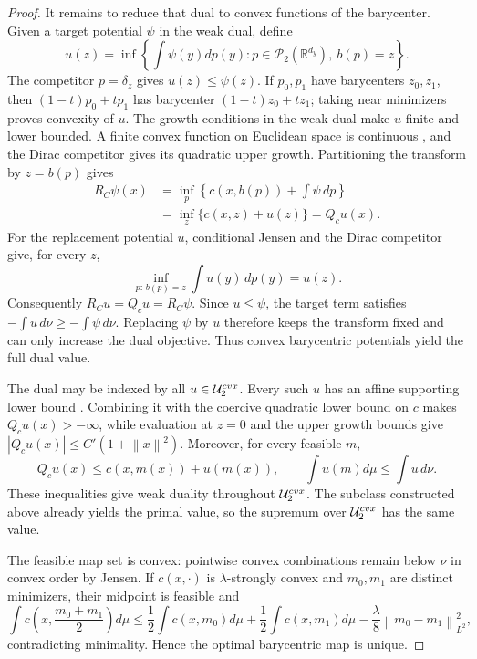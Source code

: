 \documentclass[10pt,a4paper]{amsart}
\newcommand{\R}{\mathbb R}
\newcommand{\cP}{\mathcal P}
\newcommand{\norm}[1]{\left\lVert #1\right\rVert}
\begin{document}
\begin{proof}
It remains to reduce that dual to convex functions of the barycenter.  Given a
target potential $\psi$ in the weak dual, define
\[
 u(z)=\inf\left\{\int\psi(y)dp(y):p\in\cP_2(\R^{d_y}),\ b(p)=z\right\}.
\]
The competitor $p=\delta_z$ gives $u(z)\le\psi(z)$.  If $p_0,p_1$ have
barycenters $z_0,z_1$, then $(1-t)p_0+tp_1$ has barycenter
$(1-t)z_0+tz_1$; taking near minimizers proves convexity of $u$.  The growth
conditions in the weak dual make $u$ finite and lower bounded.  A finite convex
function on Euclidean space is continuous
\cite[Corollary~10.1.1]{Rockafellar}, and the Dirac competitor gives its
quadratic upper growth.  Partitioning the transform by $z=b(p)$ gives
\begin{align*}
 R_C\psi(x)
 &=\inf_{p}\left\{c(x,b(p))+\int\psi\,dp\right\}\\
 &=\inf_z\{c(x,z)+u(z)\}=Q_cu(x).
\end{align*}
For the replacement potential $u$, conditional Jensen and the Dirac competitor
give, for every $z$,
\[
 \inf_{p:\,b(p)=z}\int u(y)\,dp(y)=u(z).
\]
Consequently $R_Cu=Q_cu=R_C\psi$.  Since $u\le\psi$, the target term satisfies
$-\int u\,d\nu\ge-\int\psi\,d\nu$.  Replacing $\psi$ by $u$ therefore keeps the
transform fixed and can only increase the dual objective.  Thus convex barycentric
potentials yield the full dual value.

The dual may be indexed by all $u\in\mathcal U_2^{\rm cvx}$.  Every such $u$ has
an affine supporting lower bound
\cite[Corollary~12.1.2]{Rockafellar}.  Combining it with the coercive
quadratic lower bound on $c$ makes $Q_cu(x)>-\infty$, while evaluation at $z=0$
and the upper growth bounds give $|Q_cu(x)|\le C'(1+\norm x^2)$.  Moreover, for
every feasible $m$,
\[
 Q_cu(x)\le c(x,m(x))+u(m(x)),\qquad
 \int u(m)d\mu\le\int u\,d\nu.
\]
These inequalities give weak duality throughout $\mathcal U_2^{\rm cvx}$.  The
subclass constructed above already yields the primal value, so the supremum over
$\mathcal U_2^{\rm cvx}$ has the same value.

The feasible map set is convex: pointwise convex combinations remain below $\nu$
in convex order by Jensen.  If $c(x,\cdot)$ is $\lambda$-strongly convex and
$m_0,m_1$ are distinct minimizers, their midpoint is feasible and
\[
 \int c\left(x,\frac{m_0+m_1}{2}\right)d\mu
 \le\frac12\int c(x,m_0)d\mu+\frac12\int c(x,m_1)d\mu
 -\frac{\lambda}{8}\norm{m_0-m_1}_{L^2}^2,
\]
contradicting minimality.  Hence the optimal barycentric map is unique.
\end{proof}
\end{document}
